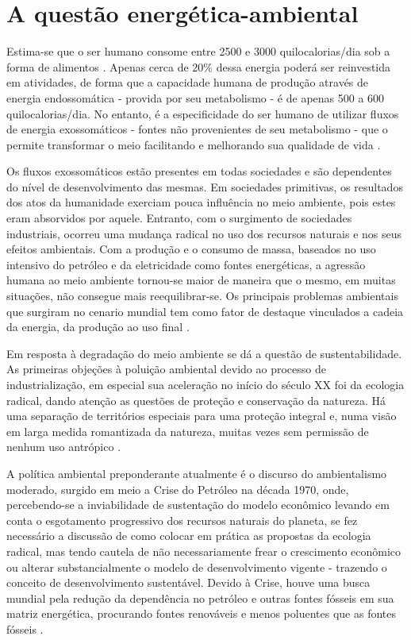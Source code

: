 \chapter{A questão energética-ambiental}

Estima-se que o ser humano consome entre 2500 e 3000 quilocalorias/dia sob a 
forma de alimentos \cite{hemery}. Apenas cerca de 20\% dessa energia poderá ser 
reinvestida em atividades, de forma que a capacidade humana de produção através
de energia endossomática - provida por seu metabolismo - é de apenas 500 a 600 
quilocalorias/dia. No entanto, é a especificidade do ser humano de utilizar 
fluxos de energia exossomáticos - fontes não provenientes de seu metabolismo 
- que o permite transformar o meio facilitando e melhorando sua qualidade de
vida \cite{rippel}.

Os fluxos exossomáticos estão presentes em todas sociedades e são dependentes do
nível de desenvolvimento das mesmas. Em sociedades primitivas, os resultados dos
atos da humanidade exerciam pouca influência no meio ambiente, pois estes eram
absorvidos por aquele. Entranto, com o surgimento de sociedades industriais,
ocorreu uma mudança radical no uso dos recursos naturais e nos seus efeitos
ambientais. Com a produção e o consumo de massa, baseados no uso intensivo do
petróleo e da eletricidade como fontes energéticas, a agressão humana ao meio 
ambiente tornou-se maior de maneira que o mesmo, em muitas situações, não 
consegue mais reequilibrar-se. Os principais problemas ambientais que surgiram 
no cenario mundial tem como fator de destaque vinculados a cadeia da energia, 
da produção ao uso final \cite{rippel,pen15_eff_energ,jatoba}. 

Em resposta à degradação do meio ambiente se dá a questão de
sustentabilidade. As primeiras objeções à poluição ambiental devido ao processo 
de industrialização, em especial sua aceleração no início do século XX 
foi da ecologia radical, dando atenção as questões de proteção e conservação da natureza.
Há uma separação de territórios especiais para uma proteção integral e, numa
visão em larga medida romantizada da natureza, muitas vezes sem permissão 
de nenhum uso antrópico \cite{jatoba}.

A política ambiental preponderante atualmente é o discurso do ambientalismo moderado, 
surgido em meio a Crise do Petróleo na década 1970, onde, percebendo-se a
inviabilidade de sustentação do modelo econômico levando em conta o esgotamento
progressivo dos recursos naturais do planeta, se fez necessário a discussão de como 
colocar em prática as propostas da ecologia radical, mas tendo cautela de não 
necessariamente frear o crescimento econômico ou alterar substancialmente o 
modelo de desenvolvimento vigente - trazendo o conceito de desenvolvimento
sustentável. Devido à Crise, houve uma busca mundial pela redução da 
dependência no petróleo e outras fontes fósseis em sua matriz energética, 
procurando fontes renováveis e menos poluentes que as fontes fósseis 
\cite{jatoba,eff_dec_energ_2012,rippel}. 

